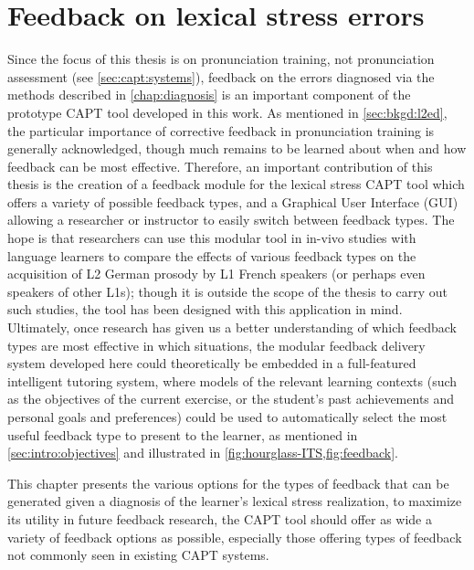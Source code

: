 %
%
\chapter{Feedback on lexical stress errors}
\label{chap:feedback}


Since the focus of this thesis is on pronunciation training, not pronunciation assessment (see \cref{sec:capt:systems}), feedback on the errors diagnosed via the methods described in \cref{chap:diagnosis} is an important component of the prototype CAPT tool developed in this work. As mentioned in \cref{sec:bkgd:l2ed}, the particular importance of corrective feedback in pronunciation training is generally acknowledged,
though much remains to be learned about when and how feedback can be most effective. Therefore, an important contribution of this thesis is the creation of a feedback module for the lexical stress CAPT tool which offers a variety of possible feedback types, and a Graphical User Interface (GUI) allowing a researcher or instructor to easily switch between feedback types. The hope is that researchers can use this modular tool in in-vivo studies with language learners to compare the effects of various feedback types on the acquisition of L2 German prosody by L1 French speakers (or perhaps even speakers of other L1s); though it is outside the scope of the thesis to carry out 
such studies,
the tool has been designed 
with this application in mind.
Ultimately, once research has given us a better understanding of which feedback types are most effective in which situations, the modular feedback delivery system developed here could theoretically be embedded in a full-featured intelligent tutoring system, where models of the relevant learning contexts (such as  the objectives of the current exercise, or the student's past achievements and personal goals and preferences) could be used to automatically select the most useful feedback type to present to the learner, as mentioned in \cref{sec:intro:objectives} and illustrated in \cref{fig:hourglass-ITS,fig:feedback}.

This chapter presents the various options for the types of feedback that can be generated given a diagnosis of the learner's lexical stress realization, 
 to maximize its utility in future feedback research, the CAPT tool should offer as wide a variety of feedback options as possible, especially those offering types of feedback not commonly seen in existing CAPT systems. 

